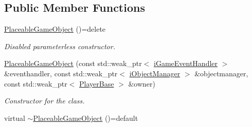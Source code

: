 \subsection*{Public Member Functions}
\begin{DoxyCompactItemize}
\item 
\hypertarget{class_course_1_1_placeable_game_object_adde506e2a75757799f54b14b464cf128}{\hyperlink{class_course_1_1_placeable_game_object_adde506e2a75757799f54b14b464cf128}{Placeable\-Game\-Object} ()=delete}\label{class_course_1_1_placeable_game_object_adde506e2a75757799f54b14b464cf128}

\begin{DoxyCompactList}\small\item\em Disabled parameterless constructor. \end{DoxyCompactList}\item 
\hyperlink{class_course_1_1_placeable_game_object_a5f4e7bbda3c6f9debbdbd311ec19c9da}{Placeable\-Game\-Object} (const std\-::weak\-\_\-ptr$<$ \hyperlink{class_course_1_1i_game_event_handler}{i\-Game\-Event\-Handler} $>$ \&eventhandler, const std\-::weak\-\_\-ptr$<$ \hyperlink{class_course_1_1i_object_manager}{i\-Object\-Manager} $>$ \&objectmanager, const std\-::weak\-\_\-ptr$<$ \hyperlink{class_course_1_1_player_base}{Player\-Base} $>$ \&owner)
\begin{DoxyCompactList}\small\item\em Constructor for the class. \end{DoxyCompactList}\item 
\hypertarget{class_course_1_1_placeable_game_object_ab0e0ad8ecd20bf48faefc6c51056066f}{virtual \hyperlink{class_course_1_1_placeable_game_object_ab0e0ad8ecd20bf48faefc6c51056066f}{$\sim$\-Placeable\-Game\-Object} ()=default}\label{class_course_1_1_placeable_game_object_ab0e0ad8ecd20bf48faefc6c51056066f}


\end{DoxyCompactItemize}
